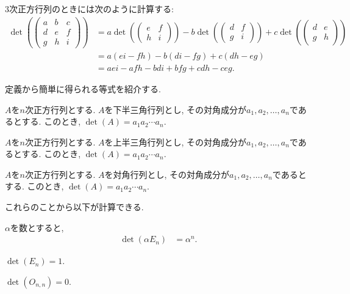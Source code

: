\begin{example}
  $3$次正方行列のときには次のように計算する:
  \begin{align*}
    \det(
    \begin{pmatrix}
      a&b&c\\
      d&e&f\\
      g&h&i      
    \end{pmatrix}
    )
    &=a
    \det(
    \begin{pmatrix}
      e&f\\
      h&i      
    \end{pmatrix}
    )-b
    \det(
    \begin{pmatrix}
      d&f\\
      g&i      
    \end{pmatrix}
    )
    +c
    \det(
    \begin{pmatrix}
      d&e\\
      g&h      
    \end{pmatrix}
    )\\
    &=a(ei-fh)
    -b(di-fg)
    +c(dh-eg)\\
    &=aei-afh
    -bdi+bfg
    +cdh-ceg
    .
  \end{align*}
\end{example}


定義から簡単に得られる等式を紹介する.
\begin{prop}
  $A$を$n$次正方行列とする.
  $A$を下半三角行列とし,
  その対角成分が$a_1,a_2,\ldots,a_n$であるとする.
  このとき,
  $\det(A)=a_1a_2\cdots a_n$.
\end{prop}

\begin{prop}
  $A$を$n$次正方行列とする.
  $A$を上半三角行列とし,
  その対角成分が$a_1,a_2,\ldots,a_n$であるとする.
  このとき,
  $\det(A)=a_1a_2\cdots a_n$.
\end{prop}

\begin{cor}
  $A$を$n$次正方行列とする.
  $A$を対角行列とし,
  その対角成分が$a_1,a_2,\ldots,a_n$であるとする.
  このとき,
  $\det(A)=a_1a_2\cdots a_n$.
\end{cor}


これらのことから以下が計算できる.
\begin{example}
  $\alpha$を数とすると,
  \begin{align*}
    \det(\alpha E_{n})&=\alpha^n.
  \end{align*}
\end{example}
\begin{example}
  $\det(E_{n})=1$.
\end{example}
\begin{example}
  $\det(O_{n,n})=0$.
\end{example}

